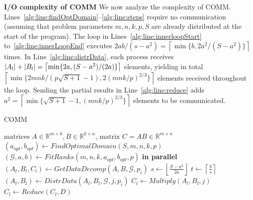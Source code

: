 \documentclass[sigplan,review,anonymous,10pt]{acmart}\settopmatter{printfolios=true,printccs=false,printacmref=false}
\newcommand{\macb}[1]{\textbf{\textsf{#1}}}
\begin{document}
\macb{I/O complexity of COMM}
We now analyze the complexity of COMM. 
Lines~\ref{alg:line:findOptDomain}--\ref{alg:line:steps} require no 
communication 
(assuming that problem 
parameters $m, n, k, p, S$ are already distributed at the start of the program).
The loop in Lines~\ref{alg:line:innerloopStart} to~\ref{alg:line:innerLoopEnd} 
executes $2ab/(s-a^2) = 
\left\lceil{\min\{b, 2a^2/(S-a^2) \}} \right \rceil$ times. In 
Line~\ref{alg:line:distrData}, each process receives $|A_l| + |B_l| = \linebreak
\left\lceil{\min\{2a, (S-a^2)/(2a) \}} \right \rceil$ elements, yielding in 
total \linebreak$\left\lceil{\min\{2mnk/(p\sqrt{S + 1} - 1), 2(mnk/p)^{2/3} \}} 
\right 
\rceil$ elements received throughout the loop. Sending the partial results in 
Line~\ref{alg:line:reduce} adds $a^2 = \left\lceil{\min\{\sqrt{S+1} - 1, 
(mnk/p)^{2/3}\}}\right\rceil$ 
elements to be communicated.



\begin{algorithm}
	\small
\caption{COMM} \label{alg:comm}
\begin{algorithmic}[1]
\Require $\text{matrices } A \in \mathbb{R}^{m \times k}, B \in 
\mathbb{R}^{k \times n}$,
\Ensure $\text{matrix } C = AB \in \mathbb{R}^{m \times n}$
%
%
\State $(a_{opt}, b_{opt}) \gets FindOptimalDomain(S,m,n,k,p)$ 
\label{alg:line:findOptDomain}
%
\State $(\mathcal{G}, a, b) \gets FitRanks(m,n,k,a_{opt},b_{opt},p)$ 
\label{alg:line:fitranks}
 \textbf{in parallel}
\label{alg:line:outerloopStart}
%
\State $(A_l, B_l, C_l) \gets GetDataDecomp(A,B, \mathcal{G}, p_i)$ 
\label{alg:line:datadecomp}
\State $s \gets \left \lfloor{\frac{S - a^2}{2a}}\right \rfloor$ 
\label{alg:line:stepsize}
\State $t \gets \left \lceil{\frac{b}{s}}\right \rceil$ 
\label{alg:line:steps}
\label{alg:line:innerloopStart}
\State $(A_l, B_l) \gets DistrData(A_l,B_l,\mathcal{G}, j, p_i)$ 
\label{alg:line:distrData}
\State $C_l \gets Multiply(A_l, B_l,j)$ 
\label{alg:line:compute}
\EndFor
\label{alg:line:innerLoopEnd}
\State $C_l \gets Reduce(C_l,D)$ 
\label{alg:line:reduce}
\EndFor
\label{alg:line:outerLoopEnd}
\end{algorithmic}
\end{algorithm}
\end{document}
